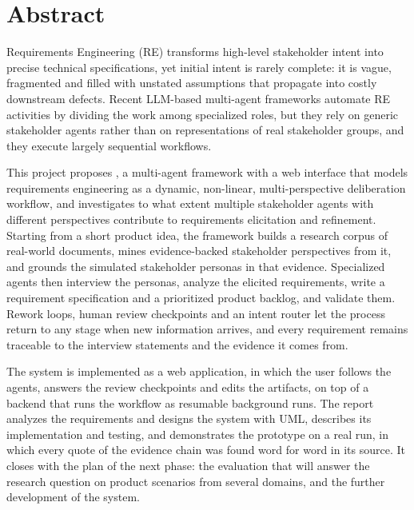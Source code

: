 \section*{\Huge Abstract}

Requirements Engineering (RE) transforms high-level stakeholder intent into precise technical specifications, yet initial intent is rarely complete: it is vague, fragmented and filled with unstated assumptions that propagate into costly downstream defects. Recent LLM-based multi-agent frameworks automate RE activities by dividing the work among specialized roles, but they rely on generic stakeholder agents rather than on representations of real stakeholder groups, and they execute largely sequential workflows.

This project proposes \sysname{}, a multi-agent framework with a web interface that models requirements engineering as a dynamic, non-linear, multi-perspective deliberation workflow, and investigates to what extent multiple stakeholder agents with different perspectives contribute to requirements elicitation and refinement. Starting from a short product idea, the framework builds a research corpus of real-world documents, mines evidence-backed stakeholder perspectives from it, and grounds the simulated stakeholder personas in that evidence. Specialized agents then interview the personas, analyze the elicited requirements, write a requirement specification and a prioritized product backlog, and validate them. Rework loops, human review checkpoints and an intent router let the process return to any stage when new information arrives, and every requirement remains traceable to the interview statements and the evidence it comes from.

The system is implemented as a web application, in which the user follows the agents, answers the review checkpoints and edits the artifacts, on top of a backend that runs the workflow as resumable background runs. The report analyzes the requirements and designs the system with UML, describes its implementation and testing, and demonstrates the prototype on a real run, in which every quote of the evidence chain was found word for word in its source. It closes with the plan of the next phase: the evaluation that will answer the research question on product scenarios from several domains, and the further development of the system.
